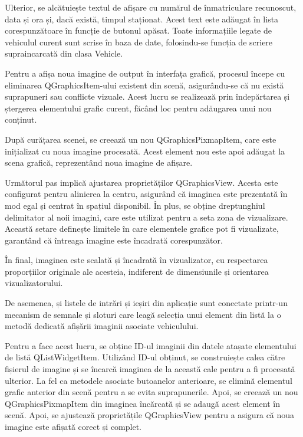 \documentclass[a4paper,12pt]{report}
\begin{document}
Ulterior, se alcătuiește textul de afișare cu numărul de înmatriculare recunoscut, data și ora și, dacă există, timpul staționat. Acest text este adăugat în lista corespunzătoare în funcție de butonul apăsat. Toate informațiile legate de vehiculul curent sunt scrise în baza de date, folosindu-se funcția de scriere supraincarcată din clasa Vehicle.

Pentru a afișa noua imagine de output în interfața grafică, procesul începe cu eliminarea QGraphicsItem-ului existent din scenă, asigurându-se că nu există suprapuneri sau conflicte vizuale. Acest lucru se realizează prin îndepărtarea și ștergerea elementului grafic curent, făcând loc pentru adăugarea unui nou conținut.

După curățarea scenei, se creează un nou QGraphicsPixmapItem, care este inițializat cu noua imagine procesată. Acest element nou este apoi adăugat la scena grafică, reprezentând noua imagine de afișare.

Următorul pas implică ajustarea proprietăților QGraphicsView. Acesta este configurat pentru alinierea la centru, asigurând că imaginea este prezentată în mod egal și centrat în spațiul disponibil. În plus, se obține dreptunghiul delimitator al noii imagini, care este utilizat pentru a seta zona de vizualizare. Această setare definește limitele în care elementele grafice pot fi vizualizate, garantând că întreaga imagine este încadrată corespunzător.

În final, imaginea este scalată și încadrată în vizualizator, cu respectarea proporțiilor originale ale acesteia, indiferent de dimensiunile și orientarea vizualizatorului.

De asemenea, și listele de intrări și ieșiri din aplicație sunt conectate printr-un mecanism de semnale și sloturi care leagă selecția unui element din listă la o metodă dedicată afișării imaginii asociate vehiculului.

Pentru a face acest lucru, se obține ID-ul imaginii din datele atașate elementului de listă QListWidgetItem. Utilizând ID-ul obținut, se construiește calea către fișierul de imagine și se încarcă imaginea de la această cale pentru a fi procesată ulterior. La fel ca metodele asociate butoanelor anterioare, se elimină elementul grafic anterior din scenă pentru a se evita suprapunerile. Apoi, se creează un nou QGraphicsPixmapItem din imaginea încărcată și se adaugă acest element în scenă. Apoi, se ajustează proprietățile QGraphicsView pentru a asigura că noua imagine este afișată corect și complet.
\end{document}
